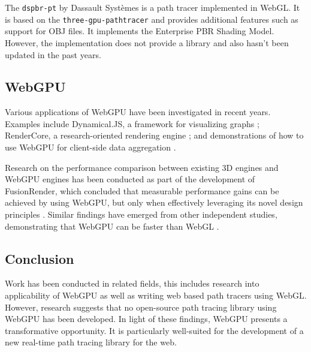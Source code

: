 The \texttt{dspbr-pt} by Dassault Systèmes \cite{PathTracerDassault} is a path tracer implemented in WebGL. It is based on the \texttt{three-gpu-pathtracer} and provides additional features such as support for \gls{OBJ} files. It implements the Enterprise PBR Shading Model. However, the implementation does not provide a library and also hasn't been updated in the past years.

\subsection*{WebGPU}

Various applications of WebGPU have been investigated in recent years. Examples include Dynamical.JS, a framework for visualizing graphs \cite{dotson2022dynamicaljs}; RenderCore, a research-oriented rendering engine \cite{Bohak_Kovalskyi_Linev_Mrak_Tadel_Strban_Tadel_Yagil_2024}; and demonstrations of how to use WebGPU for client-side data aggregation \cite{kimmersdorfer2023webgpu}.

Research on the performance comparison between existing 3D engines and WebGPU engines has been conducted as part of the development of FusionRender, which concluded that measurable performance gains can be achieved by using WebGPU, but only when effectively leveraging its novel design principles \cite{fusionRenderWebGPU}. Similar findings have emerged from other independent studies, demonstrating that WebGPU can be faster than WebGL \cite{webGPUWebGis, fransson2023performance, CHICKERUR2024919}.

\subsection*{Conclusion}

Work has been conducted in related fields, this includes research into applicability of WebGPU as well as writing web based path tracers using WebGL. However, research suggests that no open-source path tracing library using WebGPU has been developed. In light of these findings, WebGPU presents a transformative opportunity. It is particularly well-suited for the development of a new real-time path tracing library for the web.
